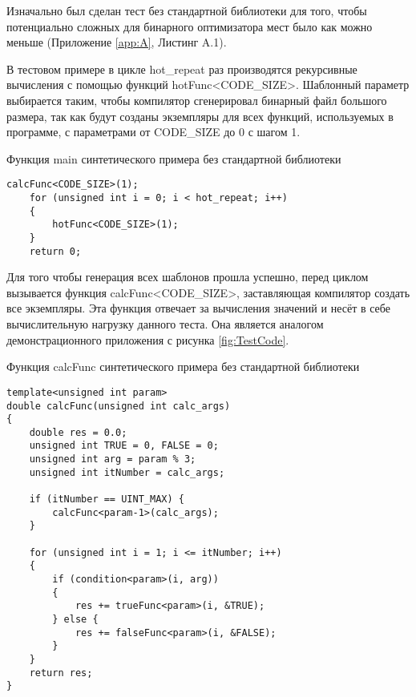 Изначально был сделан тест без стандартной библиотеки для того, чтобы потенциально сложных для бинарного оптимизатора мест было как можно меньше (Приложение \cref{app:A}, Листинг A.1).

В тестовом примере в цикле hot\_repeat раз  производятся рекурсивные вычисления с помощью функций hotFunc<CODE\_SIZE>. Шаблонный параметр выбирается таким, чтобы компилятор сгенерировал бинарный файл большого размера, так как будут созданы экземпляры для всех функций, используемых в программе, с параметрами от CODE\_SIZE до 0 с шагом 1.

\begin{ListingEnv}[h]
    \captiondelim{ } %
    \caption{Функция main синтетического примера без стандартной библиотеки}\label{lst:hwplain}
    \begin{lstlisting}[language={[ISO]C++}]
    calcFunc<CODE_SIZE>(1);
    for (unsigned int i = 0; i < hot_repeat; i++)
    {
        hotFunc<CODE_SIZE>(1);
    }
    return 0;
    \end{lstlisting}
\end{ListingEnv}%

Для того чтобы генерация всех шаблонов прошла успешно, перед циклом вызывается функция calcFunc<CODE\_SIZE>, заставляющая компилятор создать все экземпляры. Эта функция отвечает за вычисления значений и несёт в себе вычислительную нагрузку данного теста. Она является аналогом демонстрационного приложения с рисунка \cref{fig:TestCode}.

\begin{ListingEnv}[!h]
    \captiondelim{ }
    \caption{Функция calcFunc синтетического примера без стандартной библиотеки}\label{lst:hwbeauty}
    \begin{lstlisting}[language={[ISO]C++}]
template<unsigned int param>
double calcFunc(unsigned int calc_args) 
{
    double res = 0.0;
    unsigned int TRUE = 0, FALSE = 0;
    unsigned int arg = param % 3;
    unsigned int itNumber = calc_args;
    
    if (itNumber == UINT_MAX) {
        calcFunc<param-1>(calc_args);
    }

    for (unsigned int i = 1; i <= itNumber; i++)
    {
        if (condition<param>(i, arg))
        {
            res += trueFunc<param>(i, &TRUE);
        } else {
            res += falseFunc<param>(i, &FALSE);
        }
    }
    return res;
}
    \end{lstlisting}
\end{ListingEnv}%

